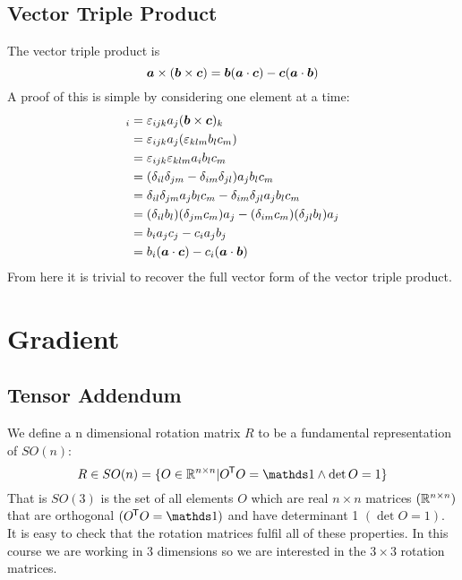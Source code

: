 \documentclass{article}
\begin{document}
    \subsection{Vector Triple Product}
    The vector triple product is
    \[\bm{a}\times(\bm{b}\times\bm{c}) = \bm{b}(\bm{a}\cdot\bm{c}) - \bm{c}(\bm{a}\cdot\bm{b})\]
    A proof of this is simple by considering one element at a time:
    \begin{align*}
        [\vv a\times(\vv b\times\vv c)]_i &= \varepsilon_{ijk}a_j(\vv b\times\vv c)_k\\
        &= \varepsilon_{ijk}a_j(\varepsilon_{klm}b_lc_m)\\
        &= \varepsilon_{ijk}\varepsilon_{klm}a_ib_lc_m\\
        &= (\delta_{il}\delta_{jm} - \delta_{im}\delta_{jl})a_jb_lc_m\\
        &= \delta_{il}\delta_{jm}a_jb_lc_m - \delta_{im}\delta_{jl}a_jb_lc_m\\
        &= (\delta_{il}b_l)(\delta_{jm}c_m)a_j - (\delta_{im}c_m)(\delta_{jl}b_l)a_j\\
        &= b_ia_jc_j - c_ia_jb_j\\
        &= b_i(\vv a\cdot\vv c) - c_i(\vv a\cdot \vv b)
    \end{align*}
    From here it is trivial to recover the full vector form of the vector triple product.
    
    \section{Gradient}
    \subsection{Tensor Addendum}
    We define a n dimensional rotation matrix \(R\) to be a fundamental representation of \(SO(n)\):
    \[R\in SO(n) = \{O \in \bb R^{n\times n}|O\trans O = \ident \wedge \det O = 1\}\]
    That is \(SO(3)\) is the set of all elements \(O\) which are real \(n\times n\) matrices \((\mathbb{R}^{n\times n})\) that are orthogonal \((O\trans O = \ident)\) and have determinant 1 \((\det O = 1)\).
    It is easy to check that the rotation matrices fulfil all of these properties.
    In this course we are working in 3 dimensions so we are interested in the \(3\times 3\) rotation matrices.
    
\end{document}

